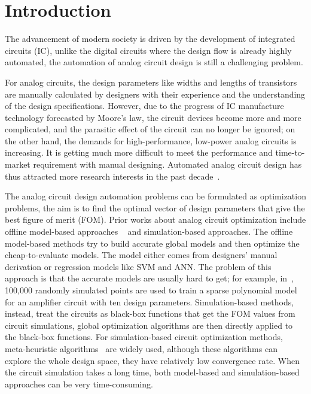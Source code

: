 \section{Introduction}

%
The advancement of modern society is driven by the development of integrated
circuits (IC), unlike the digital circuits where the design flow is already
highly automated, the automation of analog circuit design is still a
challenging problem. 

For analog circuits, the design parameters like widths and lengths of
transistors are manually calculated by designers with their experience and the
understanding of the design specifications. However, due to the progress of IC
manufacture technology forecasted by Moore's law, the circuit devices become
more and more complicated, and the parasitic effect of the circuit can no
longer be ignored; on the other hand, the demands for high-performance,
low-power analog circuits is increasing. It is getting much more difficult to
meet the performance and time-to-market requirement with manual designing.
Automated analog circuit design has thus attracted more research interests in
the past decade~\cite{rutenbar2007hierarchical}.

The analog circuit design automation problems can be formulated as optimization
problems, the aim is to find the optimal vector of design parameters that give
the best figure of merit (FOM). Prior works about analog circuit optimization
include offline model-based approaches
~\cite{colleran2003optimization,daems2003simulation,wang2014enabling} and
simulation-based approaches. The offline model-based methods try to build
accurate global models and then optimize the cheap-to-evaluate models. The
model either comes from designers' manual derivation or regression models like
SVM and ANN. The problem of this approach is that the accurate models are
usually hard to get; for example, in~\cite{wang2014enabling}, 100,000 randomly
simulated points are used to train a sparse polynomial model for an amplifier
circuit with ten design parameters. Simulation-based methods, instead, treat
the circuits as black-box functions that get the FOM values from circuit
simulations, global optimization algorithms are then directly applied to the
black-box functions.  For simulation-based circuit optimization methods,
meta-heuristic algorithms~\cite{phelps2000anaconda, liu2009analog} are widely
used, although these algorithms can explore the whole design space, they have
relatively low convergence rate. When the circuit simulation takes a long time,
both model-based and simulation-based approaches can be very time-consuming.

